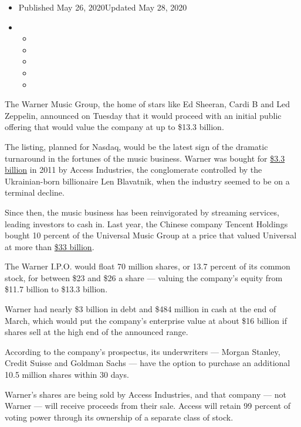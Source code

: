 \begin{itemize}
\item
  Published May 26, 2020Updated May 28, 2020
\item
  \begin{itemize}
  \item
  \item
  \item
  \item
  \item
  \end{itemize}
\end{itemize}

The Warner Music Group, the home of stars like Ed Sheeran, Cardi B and
Led Zeppelin, announced on Tuesday that it would proceed with an initial
public offering that would value the company at up to \$13.3 billion.

The listing, planned for Nasdaq, would be the latest sign of the
dramatic turnaround in the fortunes of the music business. Warner was
bought for
\href{https://dealbook.nytimes3xbfgragh.onion/2011/05/06/warner-music-to-sell-itself-to-access-for-3-3-billion/}{\$3.3
billion} in 2011 by Access Industries, the conglomerate controlled by
the Ukrainian-born billionaire Len Blavatnik, when the industry seemed
to be on a terminal decline.

Since then, the music business has been reinvigorated by streaming
services, leading investors to cash in. Last year, the Chinese company
Tencent Holdings bought 10 percent of the Universal Music Group at a
price that valued Universal at more than
\href{https://www.musicbusinessworldwide.com/official-universal-music-group-to-sell-10-stake-worth-over-3bn-to-tencent-led-consortium/}{\$33
billion}.

The Warner I.P.O. would float 70 million shares, or 13.7 percent of its
common stock, for between \$23 and \$26 a share --- valuing the
company's equity from \$11.7 billion to \$13.3 billion.

Warner had nearly \$3 billion in debt and \$484 million in cash at the
end of March, which would put the company's enterprise value at about
\$16 billion if shares sell at the high end of the announced range.

According to the company's prospectus, its underwriters --- Morgan
Stanley, Credit Suisse and Goldman Sachs --- have the option to purchase
an additional 10.5 million shares within 30 days.

Warner's shares are being sold by Access Industries, and that company
--- not Warner --- will receive proceeds from their sale. Access will
retain 99 percent of voting power through its ownership of a separate
class of stock.

